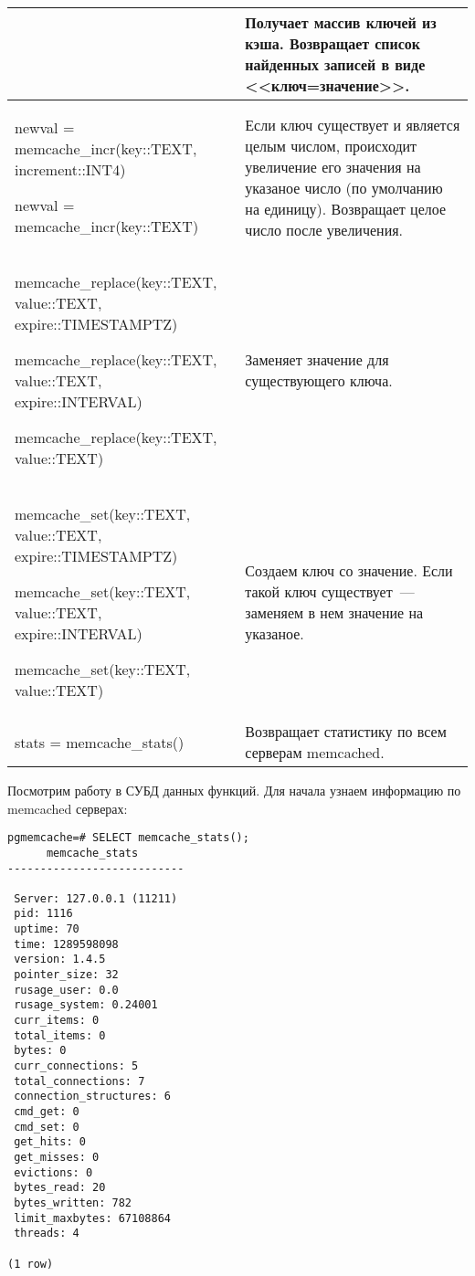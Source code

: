 \begin{table}[h]
\begin{tabular}{| >{\raggedright\scriptsize}p{7cm}| >{\scriptsize}p{7cm} |}
& 
Получает массив ключей из кэша.
Возвращает список найденных записей в виде <<ключ=значение>>.\\

\hline

newval = memcache\_incr(key::TEXT, increment::INT4)

newval = memcache\_incr(key::TEXT)

& 
Если ключ существует и является целым числом, происходит увеличение 
его значения на указаное число (по умолчанию на единицу). 
Возвращает целое число после увеличения.\\

\hline

memcache\_replace(key::TEXT, value::TEXT, expire::TIMESTAMPTZ)

memcache\_replace(key::TEXT, value::TEXT, expire::INTERVAL)

memcache\_replace(key::TEXT, value::TEXT)

& 
Заменяет значение для существующего ключа.\\

\hline

memcache\_set(key::TEXT, value::TEXT, expire::TIMESTAMPTZ)

memcache\_set(key::TEXT, value::TEXT, expire::INTERVAL)

memcache\_set(key::TEXT, value::TEXT)

& 
Создаем ключ со значение. Если такой ключ существует~--- заменяем в нем значение на указаное.\\

\hline

stats = memcache\_stats()

& 
Возвращает статистику по всем серверам memcached.\\

\hline
\end{tabular}
\end{table}

Посмотрим работу в СУБД данных функций. Для начала узнаем информацию по memcached серверах:
\begin{lstlisting}[label=lst:pgcache7,caption=Проверка memcache\_stats]
pgmemcache=# SELECT memcache_stats();
      memcache_stats       
---------------------------
 
 Server: 127.0.0.1 (11211)
 pid: 1116
 uptime: 70
 time: 1289598098
 version: 1.4.5
 pointer_size: 32
 rusage_user: 0.0
 rusage_system: 0.24001
 curr_items: 0
 total_items: 0
 bytes: 0
 curr_connections: 5
 total_connections: 7
 connection_structures: 6
 cmd_get: 0
 cmd_set: 0
 get_hits: 0
 get_misses: 0
 evictions: 0
 bytes_read: 20
 bytes_written: 782
 limit_maxbytes: 67108864
 threads: 4
 
(1 row)
\end{lstlisting}

